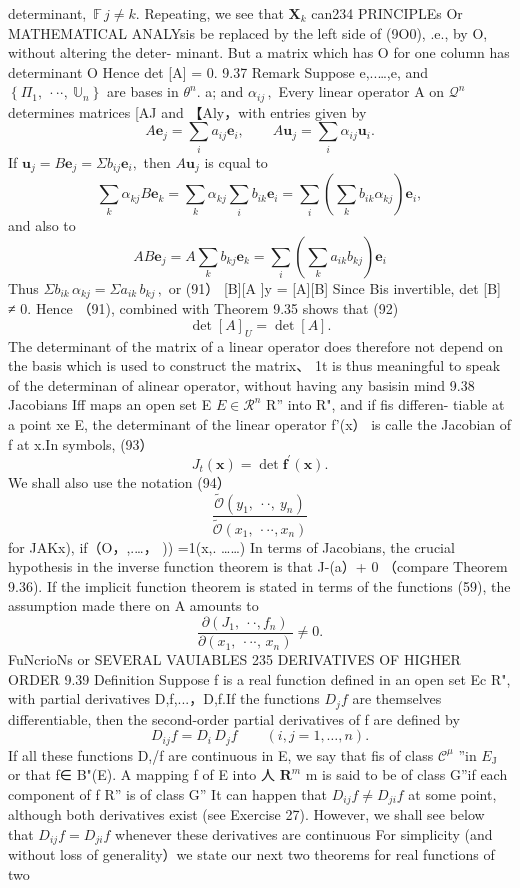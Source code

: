 determinant, $\,\mathbb{F}\,j\neq k.$ Repeating, we see that $\mathbf{X}_{k}$ can234 PRINCIPLEs Or MATHEMATICAL ANALYsis be replaced by the left side of (9O0), .e., by O, without altering the deter- minant. But a matrix which has O for one column has determinant O Hence det [A] = 0. 9.37 Remark Suppose {e,..…,e,} and $\left\{\Pi_{1},\ \cdot\cdot\cdot,\ \mathbb{U}_{n}\right\}$ are bases in $\textstyle\theta^{n}.$ a; and $\alpha_{i j}\,,$ Every linear operator A on $\textstyle{\mathcal{Q}}^{n}$ determines matrices [AJ and 【Aly，with entries given by $$ A\mathbf{e}_{j}=\sum_{i}a_{i j}\mathbf{e}_{i},\qquad A\mathbf{u}_{j}=\sum_{i}\alpha_{i j}\mathbf{u}_{i}. $$ If $\mathbf{u}_{j}=B\mathbf{e}_{j}=\Sigma b_{i j}\mathbf{e}_{i},$ then $A\mathbf{u}_{j}$ is cqual to $$ \sum_{k}\alpha_{k j}B\mathbf{e}_{k}=\sum_{k}\alpha_{k j}\sum_{i}b_{i k}\mathbf{e}_{i}=\sum_{i}\left(\sum_{k}b_{i k}\alpha_{k j}\right)\mathbf{e}_{i}, $$ and also to $$ A B\mathbf{e}_{j}=A\sum_{k}b_{k j}\mathbf{e}_{k}=\sum_{i}\left(\sum_{k}a_{i k}b_{k j}\right)\mathbf{e}_{i} $$ Thus $\Sigma b_{i k}\,\alpha_{k j}=\Sigma a_{i k}\,b_{k j}\,,$ or (91） [B][A ]y = [A][B] Since Bis invertible, det [B] ≠ 0. Hence （91), combined with Theorem 9.35 shows that (92) $$ \operatorname*{det}\left[A\right]_{U}=\operatorname*{det}\left[A\right]. $$ The determinant of the matrix of a linear operator does therefore not depend on the basis which is used to construct the matrix、 1t is thus meaningful to speak of the determinan of alinear operator, without having any basisin mind 9.38 Jacobians Iff maps an open set E $E\in{\mathcal{R}}^{n}$ R” into R", and if fis differen- tiable at a point xe E, the determinant of the linear operator f'(x） is calle the Jacobian of f at x.In symbols, (93） $$ J_{t}(\mathbf{x})=\operatorname*{det}\mathbf{f}^{\prime}(\mathbf{x}). $$ We shall also use the notation (94） $$ {\frac{{\tilde{\mathcal{O}}}(y_{1},\ \cdot\cdot,\ y_{n})}{{\tilde{\mathcal{O}}}(x_{1},\ \cdot\cdot\cdot,x_{n})}} $$ for JAKx), if（O，,.…， )) =1(x,. ……) In terms of Jacobians, the crucial hypothesis in the inverse function theorem is that J-(a）+ 0 （compare Theorem 9.36). If the implicit function theorem is stated in terms of the functions (59), the assumption made there on A amounts to $$ {\frac{\partial(J_{1},\ \cdot\cdot,f_{n})}{\partial(x_{1},\ \cdot\cdot\cdot,\,x_{n})}}\neq0. $$FuNcrioNs or SEVERAL VAUIABLES 235 DERIVATIVES OF HIGHER ORDER 9.39 Definition Suppose f is a real function defined in an open set Ec R", with partial derivatives D,f,...，D,f.If the functions $D_{j}f$ are themselves differentiable, then the second-order partial derivatives of f are defined by $$ D_{i j}f=D_{i}\,D_{j}f\qquad(i,j=1,\ldots,n). $$ If all these functions D,/f are continuous in E, we say that fis of class ${\mathcal{C}}^{\mu}$ ”in $\textstyle E_{\mathrm{{J}}}$ or that f∈ B"(E). A mapping f of E into 人 ${\boldsymbol{R}}^{m}$ m is said to be of class G”if each component of f R” is of class G” It can happen that $D_{i j}f\neq D_{j i}f$ at some point, although both derivatives exist (see Exercise 27). However, we shall see below that $D_{i j}f=D_{j i}f$ whenever these derivatives are continuous For simplicity (and without loss of generality）we state our next two theorems for real functions of two 